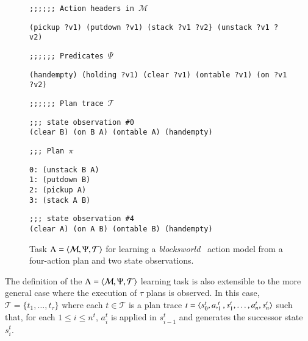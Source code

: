 \begin{figure}[hbt!]
{\footnotesize\tt ;;;;;; Action headers in $\mathcal{M}$}  
\begin{footnotesize}  
\begin{verbatim}
(pickup ?v1) (putdown ?v1) (stack ?v1 ?v2} (unstack ?v1 ?v2)
\end{verbatim}
\end{footnotesize}
\vspace{0.2cm}
{\footnotesize\tt ;;;;;; Predicates $\Psi$}
\begin{footnotesize}
\begin{verbatim}
(handempty) (holding ?v1) (clear ?v1) (ontable ?v1) (on ?v1 ?v2)
\end{verbatim}
\end{footnotesize}
\vspace{0.2cm}
{\footnotesize\tt ;;;;;; Plan trace $\mathcal{T}$}
\begin{footnotesize}
\begin{verbatim}
;;; state observation #0
(clear B) (on B A) (ontable A) (handempty)
\end{verbatim}
\end{footnotesize}

\begin{footnotesize}
{\footnotesize\tt ;;; Plan $\pi$}
\begin{verbatim}
0: (unstack B A)
1: (putdown B)
2: (pickup A)
3: (stack A B)
\end{verbatim}
\end{footnotesize}

\begin{footnotesize}
\begin{verbatim}
;;; state observation #4
(clear A) (on A B) (ontable B) (handempty)
\end{verbatim}
\end{footnotesize}

 \caption{\small Task $\Lambda={\langle \mathcal{M},\Psi,\mathcal{T} \rangle}$ for learning a {\em blocksworld} \strips\ action model from a four-action plan and two state observations.}
\label{fig:example-plans}
\end{figure}

The definition of the $\Lambda={\langle \mathcal{M},\Psi,\mathcal{T} \rangle}$ learning task is also extensible to the more general case where the execution of $\tau$ plans is observed. In this case, $\mathcal{T}=\{t_1,\ldots,t_{\tau}\}$ where each $t\in \mathcal{T}$ is a plan trace $t={\langle s_0^t,a,_1^t,s_1^t,\ldots,a_n^t,s_{n}^t \rangle}$ such that, for each {\small $1\leq i\leq n^t$}, $a_i^t$ is applied in $s_{i-1}^t$ and generates the successor state $s_i^t$.


